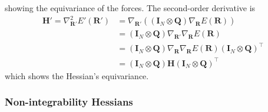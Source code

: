 \documentclass[pdflatex,sn-mathphys-num]{sn-jnl}%
\theoremstyle{thmstyleone}%
\theoremstyle{thmstyletwo}%
\theoremstyle{thmstylethree}%
\begin{document}
\begin{appendices}
showing the equivariance of the forces. The second-order derivative is
\begin{align}
    \mathbf{H}' = \nabla^2_\mathbf{R'} E'(\mathbf{R'}) &= \nabla_\mathbf{R'} ((\mathbf{I}_{N} \otimes \mathbf{Q})\nabla_\mathbf{R}E(\mathbf{R})) \\
    &=(\mathbf{I}_{N} \otimes \mathbf{Q})\nabla_\mathbf{R'}\nabla_\mathbf{R}E(\mathbf{R}) \\
    &=(\mathbf{I}_{N} \otimes \mathbf{Q})\nabla_\mathbf{R}\nabla_\mathbf{R}E(\mathbf{R}) (\mathbf{I}_{N} \otimes \mathbf{Q})^\top \\
    &=(\mathbf{I}_{N} \otimes \mathbf{Q})\mathbf{H} (\mathbf{I}_{N} \otimes \mathbf{Q})^\top
\end{align}
which shows the Hessian's equivariance. 

\subsubsection{Non-integrability Hessians\label{sec:conservative}}

\end{appendices}
\end{document}
